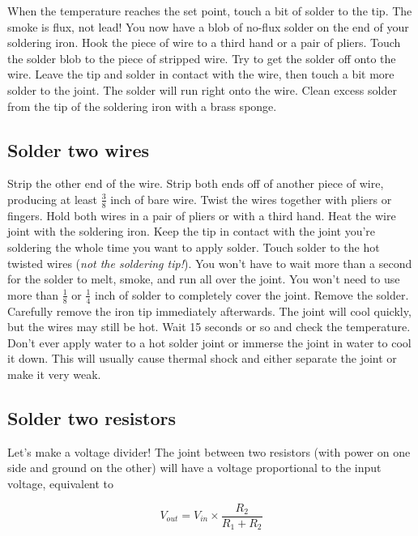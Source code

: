 \documentclass[12pt]{article}
\begin{document}
When the temperature reaches the set point, touch a bit of solder to the tip. The smoke is flux, not lead! You now have a blob of no-flux solder on the end of your soldering iron. Hook the piece of wire to a third hand or a pair of pliers. Touch the solder blob to the piece of stripped wire. Try to get the solder off onto the wire. Leave the tip and solder in contact with the wire, then touch a bit more solder to the joint. The solder will run right onto the wire. Clean excess solder from the tip of the soldering iron with a brass sponge.

\subsection{Solder two wires}

Strip the other end of the wire. Strip both ends off of another piece of wire, producing at least $\frac{3}{8}$ inch of bare wire. Twist the wires together with pliers or fingers. Hold both wires in a pair of pliers or with a third hand. Heat the wire joint with the soldering iron. Keep the tip in contact with the joint you're soldering the whole time you want to apply solder. Touch solder to the hot twisted wires (\emph{not the soldering tip!}). You won't have to wait more than a second for the solder to melt, smoke, and run all over the joint. You won't need to use more than $\frac{1}{8}$ or $\frac{1}{4}$ inch of solder to completely cover the joint. Remove the solder. Carefully remove the iron tip immediately afterwards. The joint will cool quickly, but the wires may still be hot. Wait 15 seconds or so and check the temperature. Don't ever apply water to a hot solder joint or immerse the joint in water to cool it down. This will usually cause thermal shock and either separate the joint or make it very weak.

\subsection{Solder two resistors}

Let's make a voltage divider! The joint between two resistors (with power on one side and ground on the other) will have a voltage proportional to the input voltage, equivalent to

\begin{Large}
\begin{equation*}
V_{out} = V_{in} \times \frac{R_2}{R_1 + R_2}
\end{equation*}
\end{Large}
\end{document}
